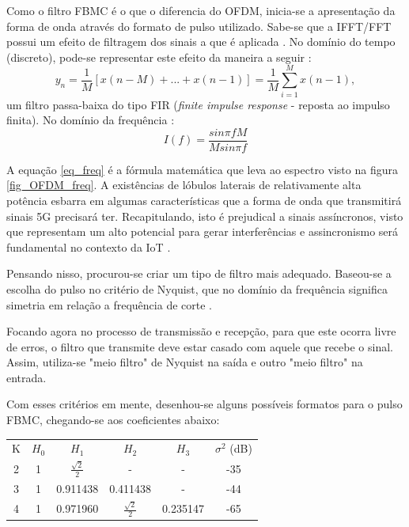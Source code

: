 Como o filtro FBMC é o que o diferencia do OFDM, inicia-se a apresentação da forma de onda através do formato de pulso utilizado. Sabe-se que a IFFT/FFT possui um efeito de filtragem dos sinais a que é aplicada \cite{Boroujeny}. No domínio do tempo (discreto), pode-se representar este efeito da maneira a seguir \cite{Bellanger}:
\begin{equation}
y_{n} = \frac{1}{M}[x(n-M)+...+x(n-1)] = \frac{1}{M}\sum_{i=1}^{M}x(n-1),
\end{equation}
um filtro passa-baixa do tipo FIR (\textit{finite impulse response} - reposta ao impulso finita). No domínio da frequência \cite{Bellanger}:
\begin{equation}\label{eq_freq}
I(f) = \frac{sin\pi fM}{Msin\pi f}
\end{equation}

A equação \ref{eq_freq} é a fórmula matemática que leva ao espectro visto na figura \ref{fig_OFDM_freq}. A existências de lóbulos laterais de relativamente alta potência esbarra em algumas características que a forma de onda que transmitirá sinais 5G precisará ter. Recapitulando, isto é prejudical a sinais assíncronos, visto que representam um alto potencial para gerar interferências e assincronismo será fundamental no contexto da IoT \cite{Wunder}.  
\par Pensando nisso, procurou-se criar um tipo de filtro mais adequado. Baseou-se a escolha do pulso no critério de Nyquist, que no domínio da frequência significa simetria em relação a frequência de corte \cite{Bellanger}. 
\par Focando agora no processo de transmissão e recepção, para que este ocorra livre de erros, o filtro que transmite deve estar casado com aquele que recebe o sinal. Assim, utiliza-se "meio filtro" de Nyquist na saída e outro "meio filtro" na entrada. 
\par Com esses critérios em mente, desenhou-se alguns possíveis formatos para o pulso FBMC, chegando-se aos coeficientes abaixo: 

\begin{center} \label{coef_FBMC}
\begin{tabular}{ c c c c c c  }
 K & $H_{0}$ &  $H_{1}$ & $H_{2}$ & $H_{3}$ & $\sigma^{2}$ (dB) \\ 
 2 & 1 & $\frac{\sqrt{2}}{2}$ & - & - & -35\\  
 3 & 1 & 0.911438 & 0.411438 & - & -44\\
 4 & 1 & 0.971960 & $\frac{\sqrt{2}}{2}$ & 0.235147 & -65
\end{tabular}
\end{center}

